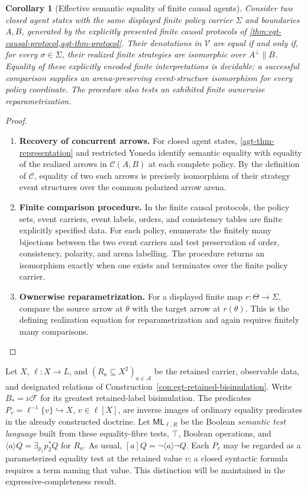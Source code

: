 \documentclass[11pt,a4paper]{article}
\numberwithin{equation}{section}
\newtheorem{corollary}[theorem]{Corollary}
\theoremstyle{definition}
\theoremstyle{remark}
\theoremstyle{plain}
\providecommand{\cC}{\mathcal{C}}
\providecommand{\cV}{\mathcal{V}}
\begin{document}
\begin{corollary}[Effective semantic equality of finite causal agents]
\label{cor:agt-finite-agent-equality}
Consider two closed agent states with the same displayed finite policy
carrier $\Sigma$ and boundaries $A,B$, generated by the explicitly
presented finite causal protocols of
\cref{thm:egt-causal-protocol,agt-thm-protocol}. Their denotations in
$\cV$ are equal if and only if, for every $\sigma\in\Sigma$,
their realized finite strategies are isomorphic over
$A^\perp\parallel B$. Equality of these explicitly encoded finite
interpretations is decidable: a successful comparison supplies an
arena-preserving event-structure isomorphism for every policy
coordinate. The procedure also tests an exhibited finite ownerwise
reparametrization.
\end{corollary}
\begin{proof}
\leavevmode
\begin{enumerate}[label=\textup{(\arabic*)},leftmargin=*,itemsep=4pt,topsep=3pt]
  \item \textbf{Recovery of concurrent arrows.} For closed agent states,
\cref{agt-thm-representation} and restricted Yoneda identify semantic
equality with equality of the realized arrows in $\cC(A,B)$ at each
complete policy. By the definition of $\cC$, equality of two such
arrows is precisely isomorphism of their strategy event structures over
the common polarized arrow arena.
  \item \textbf{Finite comparison procedure.} In the finite causal
protocols, the policy sets, event carriers, event labels, orders, and
consistency tables are finite explicitly specified data. For each
policy, enumerate the finitely many bijections between the two event
carriers and test preservation of order, consistency, polarity, and
arena labelling. The procedure returns an isomorphism exactly when one
exists and terminates over the finite policy carrier.
  \item \textbf{Ownerwise reparametrization.} For a displayed finite map
$r:\Theta\to\Sigma$, compare the source arrow at $\theta$ with the
target arrow at $r(\theta)$. This is the defining realization equation
for reparametrization and again requires finitely many comparisons.
\end{enumerate}
\end{proof}

Let $X$, $\ell:X\to L$, and $(R_a\subseteq X^2)_{a\in\mathcal A}$
be the retained carrier, observable data, and designated relations of
Construction~\ref{con:egt-retained-bisimulation}. Write $B_*=\nu\mathcal F$
for its greatest retained-label bisimulation. The predicates
$P_v=\ell^{-1}\{v\}\hookrightarrow X$, $v\in\ell[X]$, are
inverse images of ordinary equality predicates in the already
constructed doctrine. Let $\mathsf{ML}_{\ell,R}$ be the Boolean
\emph{semantic test language} built from these equality-fibre tests,
$\top$, Boolean operations, and
$\langle a\rangle Q=\exists_{p_1}p_2^*Q$ for $R_a$.
As usual, $[a]Q=\neg\langle a\rangle\neg Q$. Each $P_v$ may be
regarded as a parameterized equality test at the retained value $v$;
a closed syntactic formula requires a term naming that value. This
distinction will be maintained in the expressive-completeness result.
\end{document}
